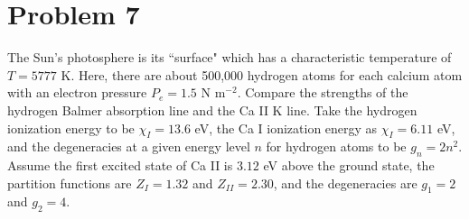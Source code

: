 \documentclass[12pt]{article}
\begin{document}
\section*{Problem 7}
The Sun's photosphere is its ``surface" which has a characteristic temperature of $T = 5777$ K. Here, there are about 500,000 hydrogen atoms for each calcium atom with an electron pressure $P_e = 1.5$ N m$^{-2}$. Compare the strengths of the hydrogen Balmer absorption line and the Ca II K line. Take the hydrogen ionization energy to be $\chi_I = 13.6$ eV, the Ca I ionization energy as $\chi_I = 6.11$ eV, and the degeneracies at a given energy level $n$ for hydrogen atoms to be $g_n = 2n^2$. Assume the first excited state of Ca II is $3.12$ eV above the ground state, the partition functions are $Z_{I} = 1.32$ and $Z_{II} = 2.30$, and the degeneracies are $g_1 = 2$ and $g_2 = 4$.
\end{document}
